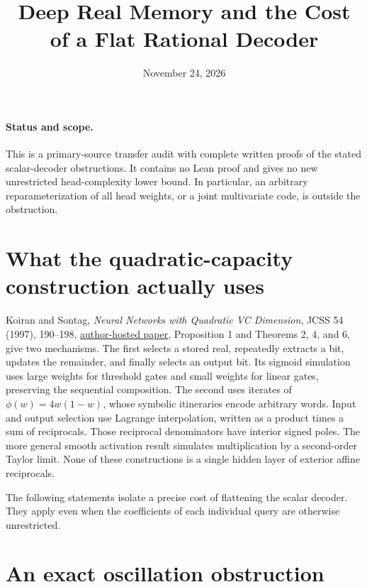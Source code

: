 \documentclass[11pt]{article}
\begin{document}
\title{Deep Real Memory and the Cost of a Flat Rational Decoder}
\author{}
\date{November 24, 2026}
\maketitle

\paragraph{Status and scope.}
This is a primary-source transfer audit with complete written proofs
of the stated scalar-decoder obstructions. It contains no Lean proof
and gives no new unrestricted head-complexity lower bound. In
particular, an arbitrary reparameterization of all head weights,
or a joint multivariate code, is outside the obstruction.

\section{What the quadratic-capacity construction actually uses}

Koiran and Sontag, \emph{Neural Networks with Quadratic VC Dimension},
JCSS 54 (1997), 190--198,
\href{https://sontaglab.org/FTPDIR/quadratic-vc.pdf}{author-hosted paper},
Proposition 1 and Theorems 2, 4, and 6, give two mechanisms.
The first selects a stored real, repeatedly extracts a bit, updates
the remainder, and finally selects an output bit. Its sigmoid
simulation uses large weights for threshold gates and small weights
for linear gates, preserving the sequential composition. The second
uses iterates of $\phi(w)=4w(1-w)$, whose symbolic itineraries encode
arbitrary words. Input and output selection use Lagrange interpolation,
written as a product times a sum of reciprocals. Those reciprocal
denominators have interior signed poles. The more general smooth
activation result simulates multiplication by a second-order Taylor
limit. None of these constructions is a single hidden layer of
exterior affine reciprocals.

The following statements isolate a precise cost of flattening the
scalar decoder. They apply even when the coefficients of each
individual query are otherwise unrestricted.

\section{An exact oscillation obstruction}
\end{document}

